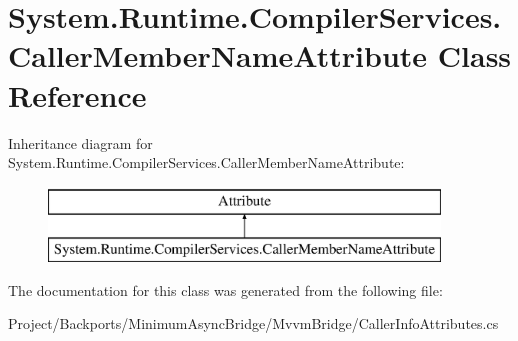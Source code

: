 \hypertarget{class_system_1_1_runtime_1_1_compiler_services_1_1_caller_member_name_attribute}{}\section{System.\+Runtime.\+Compiler\+Services.\+Caller\+Member\+Name\+Attribute Class Reference}
\label{class_system_1_1_runtime_1_1_compiler_services_1_1_caller_member_name_attribute}
Inheritance diagram for System.\+Runtime.\+Compiler\+Services.\+Caller\+Member\+Name\+Attribute\+:\begin{figure}[H]
\begin{center}
\leavevmode
\includegraphics[height=2.000000cm]{class_system_1_1_runtime_1_1_compiler_services_1_1_caller_member_name_attribute}
\end{center}
\end{figure}


The documentation for this class was generated from the following file\+:\begin{DoxyCompactItemize}
\item 
Project/\+Backports/\+Minimum\+Async\+Bridge/\+Mvvm\+Bridge/Caller\+Info\+Attributes.\+cs\end{DoxyCompactItemize}

